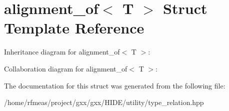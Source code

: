 \hypertarget{structalignment__of}{}\section{alignment\+\_\+of$<$ T $>$ Struct Template Reference}
\label{structalignment__of}


Inheritance diagram for alignment\+\_\+of$<$ T $>$\+:


Collaboration diagram for alignment\+\_\+of$<$ T $>$\+:


The documentation for this struct was generated from the following file\+:\begin{DoxyCompactItemize}
\item 
/home/rfmeas/project/gxx/gxx/\+H\+I\+D\+E/utility/type\+\_\+relation.\+hpp\end{DoxyCompactItemize}
